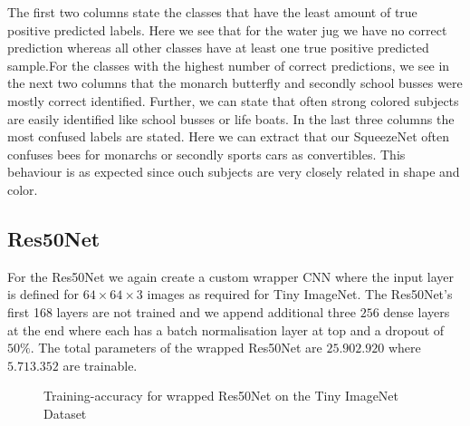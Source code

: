 \documentclass[11pt]{article}
\begin{document}
The first two columns state the classes that have the least amount of true positive predicted labels. Here we see that for the water jug we have no correct prediction whereas all other classes have at least one true positive predicted sample.For the classes with the highest number of correct predictions, we see in the next two columns that the monarch butterfly and secondly school busses were mostly correct identified. Further, we can state that often strong colored subjects are easily identified like school busses or life boats. In the last three columns the most confused labels are stated. Here we can extract that our SqueezeNet often confuses bees for monarchs or secondly sports cars as convertibles. This behaviour is as expected since ouch subjects are very closely related in shape and color.


\subsection{Res50Net}
For the Res50Net we again create a custom wrapper CNN where the input layer is defined for $64\times64\times 3$ images as required for Tiny ImageNet. The Res50Net's first 168 layers are not trained and we append additional three $256$ dense layers at the end where each has a batch normalisation layer at top and a dropout of $50\%$. The total parameters of the wrapped Res50Net are $25.902.920$ where $5.713.352$ are trainable.

\begin{figure}
\centering
{}
  \hfill
  \hfill
\caption{Training-accuracy for wrapped Res50Net on the Tiny ImageNet Dataset}
\label{rescnn::8}
\end{figure}
\end{document}
